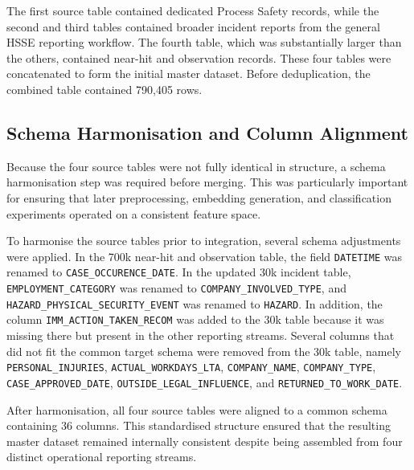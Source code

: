 \documentclass[11pt, titlepage, bibliography=totoc]{scrreprt}
\begin{document}
The first source table contained dedicated Process Safety records, while the second and third tables contained broader incident reports from the general HSSE reporting workflow. The fourth table, which was substantially larger than the others, contained near-hit and observation records. These four tables were concatenated to form the initial master dataset. Before deduplication, the combined table contained 790,405 rows.

\subsection{Schema Harmonisation and Column Alignment}

Because the four source tables were not fully identical in structure, a schema harmonisation step was required before merging. This was particularly important for ensuring that later preprocessing, embedding generation, and classification experiments operated on a consistent feature space.

To harmonise the source tables prior to integration, several schema adjustments were applied. In the 700k near-hit and observation table, the field \texttt{DATETIME} was renamed to \texttt{CASE\_OCCURENCE\_DATE}. In the updated 30k incident table, \texttt{EMPLOYMENT\_CATEGORY} was renamed to \texttt{COMPANY\_INVOLVED\_TYPE}, and \texttt{HAZARD\_PHYSICAL\_SECURITY\_EVENT} was renamed to \texttt{HAZARD}. In addition, the column \texttt{IMM\_ACTION\_TAKEN\_RECOM} was added to the 30k table because it was missing there but present in the other reporting streams. Several columns that did not fit the common target schema were removed from the 30k table, namely \texttt{PERSONAL\_INJURIES}, \texttt{ACTUAL\_WORKDAYS\_LTA}, \texttt{COMPANY\_NAME}, \texttt{COMPANY\_TYPE}, \texttt{CASE\_APPROVED\_DATE}, \texttt{OUTSIDE\_LEGAL\_INFLUENCE}, and \texttt{RETURNED\_TO\_WORK\_DATE}.

After harmonisation, all four source tables were aligned to a common schema containing 36 columns. This standardised structure ensured that the resulting master dataset remained internally consistent despite being assembled from four distinct operational reporting streams.
\end{document}
